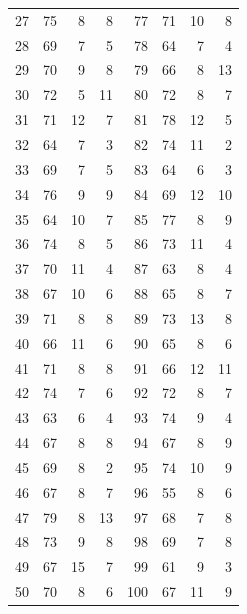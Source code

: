 \documentclass[11pt]{article}
\begin{document}
\begin{longtable}{r r r r r r r r}
27 & 75 & 8 & 8 & 77 & 71 & 10 & 8\\
28 & 69 & 7 & 5 & 78 & 64 & 7 & 4\\
29 & 70 & 9 & 8 & 79 & 66 & 8 & 13\\
30 & 72 & 5 & 11 & 80 & 72 & 8 & 7\\
31 & 71 & 12 & 7 & 81 & 78 & 12 & 5\\
32 & 64 & 7 & 3 & 82 & 74 & 11 & 2\\
33 & 69 & 7 & 5 & 83 & 64 & 6 & 3\\
34 & 76 & 9 & 9 & 84 & 69 & 12 & 10\\
35 & 64 & 10 & 7 & 85 & 77 & 8 & 9\\
36 & 74 & 8 & 5 & 86 & 73 & 11 & 4\\
37 & 70 & 11 & 4 & 87 & 63 & 8 & 4\\
38 & 67 & 10 & 6 & 88 & 65 & 8 & 7\\
39 & 71 & 8 & 8 & 89 & 73 & 13 & 8\\
40 & 66 & 11 & 6 & 90 & 65 & 8 & 6\\
41 & 71 & 8 & 8 & 91 & 66 & 12 & 11\\
42 & 74 & 7 & 6 & 92 & 72 & 8 & 7\\
43 & 63 & 6 & 4 & 93 & 74 & 9 & 4\\
44 & 67 & 8 & 8 & 94 & 67 & 8 & 9\\
45 & 69 & 8 & 2 & 95 & 74 & 10 & 9\\
46 & 67 & 8 & 7 & 96 & 55 & 8 & 6\\
47 & 79 & 8 & 13 & 97 & 68 & 7 & 8\\
48 & 73 & 9 & 8 & 98 & 69 & 7 & 8\\
49 & 67 & 15 & 7 & 99 & 61 & 9 & 3\\
50 & 70 & 8 & 6 & 100 & 67 & 11 & 9\\
\bottomrule\end{longtable}
\end{document}
